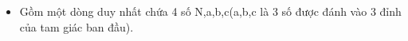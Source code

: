 \begin{itemize}
	\item     Gồm một dòng duy nhất chứa 4 số N,a,b,c(a,b,c là 3 số được đánh vào 3 đỉnh của tam giác ban đầu).   
\end{itemize}